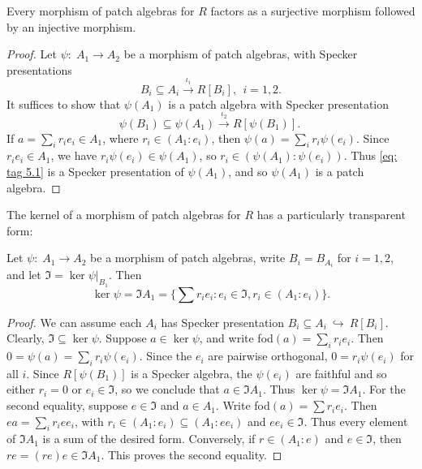 \documentclass[11pt]{amsart}
\begin{document}
\begin{proposition} \label{prop: surj, inj, bij 1}  Every morphism  of patch algebras for $R$ factors as a surjective morphism followed by an injective morphism. 
\end{proposition}

\begin{proof} 
Let $\psi\colon\; A_1 \rightarrow A_2$ be a morphism of patch algebras, with Specker presentations $$B_i \subseteq A_i \stackrel{\iota_i}{\rightarrow} R[B_i], \:\: i =1,2.$$
 It suffices to show that   $\psi(A_1)$ is a patch algebra with Specker presentation 
 \begin{equation}\label{eq: tag 5.1}
 \psi(B_{1}) \subseteq \psi(A_1) \stackrel{\iota_2}\longrightarrow R[\psi(B_{1})].\    
 \end{equation}
If $ a= \sum_i r_ie_i \in A_1$, where $r_i \in (A_1:e_i)$, then $\psi(a) = \sum_i r_i\psi(e_i)$. Since 
$r_i e_i \in A_1$, we have $r_i\psi(e_i) \in \psi(A_1)$, 
so $r_i \in (\psi(A_1):\psi(e_i))$. Thus \eqref{eq: tag 5.1} is a Specker presentation of $\psi(A_1)$, and so $\psi(A_1)$ is a patch algebra.  
\end{proof}

The kernel of a morphism of patch algebras for $R$ has a particularly transparent form: 

\begin{lemma} \label{lem: surj, inj, bij 2} Let $\psi\colon\; A_1 \rightarrow A_2$ be a morphism of patch algebras, write $B_i=B_{A_i}$ for $i=1,2$, and let ${\mathfrak I} = \ker \psi|_{B_1}$. Then 
$$\ker \psi = {\mathfrak I}A_1=\{\sum r_ie_i:e_i \in {\mathfrak I},r_i \in (A_1:e_i)\}.$$ 
\end{lemma}

\begin{proof} We can assume each $A_i$ has  Specker presentation $B_i \subseteq A_i \:{\hookrightarrow}\: R[B_i]$. Clearly, ${\mathfrak I} \subseteq \ker \psi$. Suppose $a \in \ker \psi$, and write fod$(a) = \sum_ir_ie_i$. Then $0=\psi(a) = \sum_i r_i\psi(e_i)$. Since the $e_i$ are pairwise orthogonal, $0 = r_i\psi(e_i)$ for all $i$. Since $R[\psi(B_1)]$ is a Specker algebra, the $\psi(e_i)$ are faithful and so either $r_i =0$ or $e_i \in {\mathfrak I}$, so we conclude that $a \in {\mathfrak I}A_1$.  Thus $\ker \psi = {\mathfrak I}A_1$.  
For the second equality, suppose $e \in {\mathfrak I}$ and $a \in A_1$. Write fod$(a) = \sum r_ie_i$. Then $ea=\sum_i r_i ee_i$, with $r_i\in(A_1:e_i)\subseteq(A_1:ee_i)$ and $ee_i\in\mathfrak I$.
Thus every element of $\mathfrak I A_1$ is a sum of the desired form.
Conversely, if $r\in(A_1:e)$ and $e\in\mathfrak I$, then
$re=(re)e\in\mathfrak I A_1$.
This proves the second equality.  
\end{proof}
\end{document}
